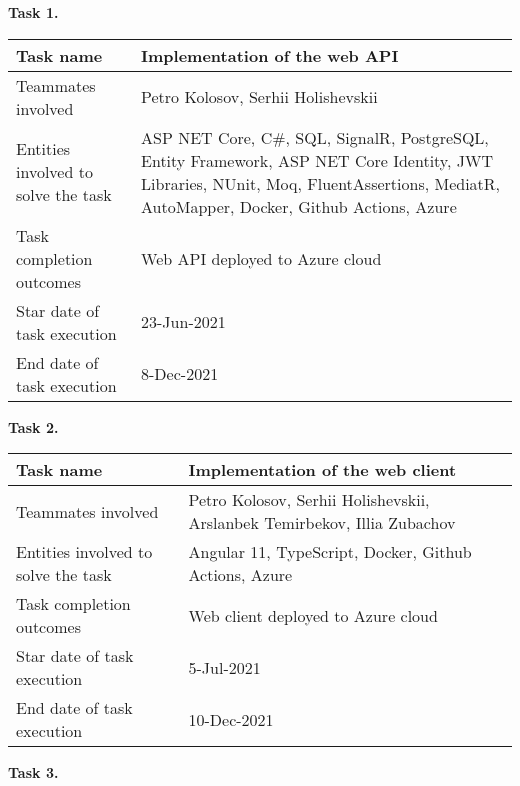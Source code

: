 \textbf{Task 1.}\\[2mm]
\begin{tabular}{|p{}|p{}|}
    \hline
    Task name                   & Implementation of the web API      \\
    \hline
    Teammates involved          & Petro Kolosov, Serhii Holishevskii \\
    \hline
    Entities involved to solve the task & ASP NET Core, C\#, SQL, SignalR, PostgreSQL,
    Entity Framework, ASP NET Core Identity,
    JWT Libraries, NUnit, Moq, FluentAssertions, MediatR, AutoMapper, Docker, Github Actions, Azure \\
    \hline
    Task completion outcomes    & Web API deployed to Azure cloud    \\
    \hline
    Star date of task execution & 23-Jun-2021                        \\
    \hline
    End date of task execution  & 8-Dec-2021                         \\
    \hline
\end{tabular}
\vskip 5mm
\hspace*{-6mm}\textbf{Task 2.}\\[2mm]
\begin{tabular}{|p{}|p{}|}
    \hline
    Task name                           & Implementation of the web client                                         \\
    \hline
    Teammates involved                  & Petro Kolosov, Serhii Holishevskii, Arslanbek Temirbekov, Illia Zubachov \\
    \hline
    Entities involved to solve the task & Angular 11, TypeScript, Docker, Github Actions, Azure                    \\
    \hline
    Task completion outcomes            & Web client deployed to Azure cloud                                       \\
    \hline
    Star date of task execution         & 5-Jul-2021                                                               \\
    \hline
    End date of task execution          & 10-Dec-2021                                                              \\
    \hline
\end{tabular}
\vskip 5mm
\hspace*{-6mm}\textbf{Task 3.}\\[2mm]
